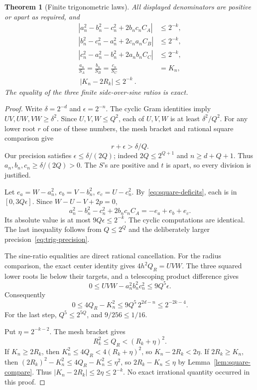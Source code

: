 \documentclass[11pt,a4paper]{article}
\newtheorem{theorem}{Theorem}[section]
\theoremstyle{definition}
\newcommand{\abs}[1]{\left|#1\right|}
\numberwithin{equation}{section}
\begin{document}
\begin{theorem}[Finite trigonometric laws]\label{thm:finite-trig}
All displayed denominators are positive or apart as required, and
\begin{align*}
 \abs{a_n^2-b_n^2-c_n^2+2b_nc_n C_A}&\le2^{-k},\\
 \abs{b_n^2-c_n^2-a_n^2+2c_na_n C_B}&\le2^{-k},\\
 \abs{c_n^2-a_n^2-b_n^2+2a_nb_n C_C}&\le2^{-k},\\
 \frac{a_n}{S_A}
   =\frac{b_n}{S_B}
   =\frac{c_n}{S_C}&=K_n,\\
 \boxed{\ \abs{K_n-2R_k}\le2^{-k}\ }.&
\end{align*}
The equality of the three finite side-over-sine ratios is exact.
\end{theorem}

\begin{proof}
Write \(\delta=2^{-d}\) and \(\epsilon=2^{-n}\).
The cyclic Gram identities imply \(UV,UW,VW\ge\delta^2\).
Since \(U,V,W\le Q^2\), each of \(U,V,W\) is at least
\(\delta^2/Q^2\). For any lower root \(r\) of one of these
numbers, the mesh bracket and rational square comparison give
\[
 r+\epsilon>\delta/Q.
 \]
Our precision satisfies \(\epsilon\le\delta/(2Q)\);
indeed \(2Q\le2^{Q+1}\) and \(n\ge d+Q+1\).
Thus \(a_n,b_n,c_n\ge\delta/(2Q)>0\).
The \(S\)'s are positive and \(t\) is apart, so every division
is justified.

Let \(e_a=W-a_n^2\), \(e_b=V-b_n^2\),
\(e_c=U-c_n^2\). By~\eqref{eq:square-deficits}, each is in
\([0,3Q\epsilon]\). Since \(W-U-V+2p=0\),
\[
 a_n^2-b_n^2-c_n^2+2b_nc_n C_A
 =-e_a+e_b+e_c.
 \]
Its absolute value is at most \(9Q\epsilon\le2^{-k}\).
The cyclic computations are identical. The last inequality follows
from \(Q\le2^Q\) and the deliberately larger
precision~\eqref{eq:trig-precision}.

The sine-ratio equalities are direct rational cancellation.
For the radius comparison, the exact center identity gives
\(4h^2Q_R=UVW\). The three squared lower roots lie below
their targets, and a telescoping product difference gives
\[
 0\le UVW-a_n^2b_n^2c_n^2\le9Q^5\epsilon.
 \]
Consequently
\[
 0\le4Q_R-K_n^2
 \le9Q^5\,2^{2d-n}
 \le2^{-2k-4}.
 \tag{8.6}\label{eq:finite-radius-square}
\]
For the last step, \(Q^5\le2^{5Q}\), and
\(9/256\le1/16\).

Put \(\eta=2^{-k-2}\). The mesh bracket gives
\[
 R_k^2\le Q_R<(R_k+\eta)^2.
 \]
If \(K_n\ge2R_k\), then
\(K_n^2\le4Q_R<4(R_k+\eta)^2\), so
\(K_n-2R_k<2\eta\).
If \(2R_k\ge K_n\), then
\((2R_k)^2-K_n^2\le4Q_R-K_n^2\le\eta^2\),
so \(2R_k-K_n\le\eta\) by
Lemma~\ref{lem:square-compare}.
Thus \(\abs{K_n-2R_k}\le2\eta\le2^{-k}\).
No exact irrational quantity occurred in this proof.
\end{proof}
\end{document}
